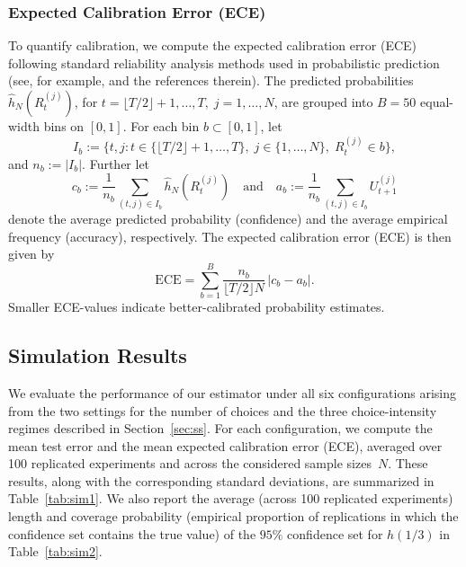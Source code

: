 \documentclass[12pt]{amsart}
\theoremstyle{plain}
\theoremstyle{remark}
\numberwithin{equation}{section}
\begin{document}
\subsubsection{Expected Calibration Error (ECE)}

To quantify calibration, we compute the 
{expected calibration error (ECE)} following standard reliability 
analysis methods used in probabilistic prediction (see, for example, \cite{PakdamanNaeini_Cooper_Hauskrecht_2015} and the references therein). The predicted probabilities \(\hat{h}_N\left(R^{(j)}_{t}\right)\), 
for \(t = \lfloor T/2 \rfloor + 1, \ldots, T,\; j=1,\ldots,N\),  are grouped into \(B = 50\) equal-width bins on \([0,1]\). For each bin \(b \subset [0,1]\), let 
\[
   I_b := \big\{ t, j : t \in \{\lfloor T/2 \rfloor + 1, \ldots, T\},\; j \in \{1,\ldots,N\},\; R^{(j)}_{t} \in b\big\},
\]
and $n_b := |I_b|$. Further let
\[
c_b := \frac{1}{n_b} \sum_{(t,j) \in I_b } \hat{h}_N\left(R^{(j)}_{t}\right)
\quad \text{and} \quad 
a_b := \frac{1}{n_b} \sum_{(t,j) \in I_b } U^{(j)}_{t+1}
\]
denote the average predicted probability ({confidence}) and the average empirical 
frequency ({accuracy}), respectively. The expected calibration error (ECE) is then given by
\[
\mathrm{ECE} = \sum_{b=1}^{B}  \frac{n_b}{\lfloor T/2 \rfloor N}
\, \big| c_b - a_b \big|.
\]
Smaller ECE-values indicate better-calibrated probability 
estimates.

\subsection{Simulation Results}

We evaluate the performance of our estimator under all six configurations arising from the two settings for the number of choices and the three choice-intensity regimes described in Section~\ref{sec:ss}. For each configuration, we compute the mean test error and the mean expected calibration error (ECE), averaged over 100 replicated  experiments and across the considered sample sizes~\(N\). These results, along with the corresponding standard deviations, are summarized in Table~\ref{tab:sim1}. 
We also report the average (across 100 replicated experiments) length and coverage probability (empirical proportion of replications in which the confidence set contains the true value) of the $95\%$ confidence set for \(h(1/3)\) in Table~\ref{tab:sim2}.
\end{document}
